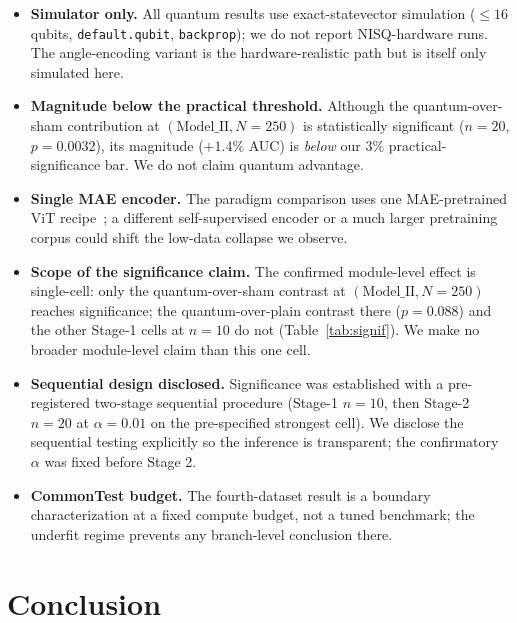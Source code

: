 \documentclass[10pt,letterpaper]{article}
\theoremstyle{plain}
\theoremstyle{definition}
\begin{document}
\begin{itemize}
  \item \textbf{Simulator only.} All quantum results use exact-statevector
        simulation ($\leq16$ qubits, \texttt{default.qubit}, \texttt{backprop});
        we do not report NISQ-hardware runs. The angle-encoding variant is the
        hardware-realistic path but is itself only simulated here.
  \item \textbf{Magnitude below the practical threshold.} Although the
        quantum-over-sham contribution at $(\text{Model\_II}, N{=}250)$ is
        statistically significant ($n{=}20$, $p{=}0.0032$), its magnitude
        ($+1.4\%$ AUC) is \emph{below} our $3\%$ practical-significance bar. We do
        not claim quantum advantage.
  \item \textbf{Single MAE encoder.} The paradigm comparison uses one
        MAE-pretrained ViT recipe~\cite{prasha2025masked}; a different
        self-supervised encoder or a much larger pretraining corpus could shift
        the low-data collapse we observe.
  \item \textbf{Scope of the significance claim.} The confirmed module-level
        effect is single-cell: only the quantum-over-sham contrast at
        $(\text{Model\_II}, N{=}250)$ reaches significance; the quantum-over-plain
        contrast there ($p{=}0.088$) and the other Stage-1 cells at $n{=}10$ do
        not (Table~\ref{tab:signif}). We make no broader module-level claim than
        this one cell.
  \item \textbf{Sequential design disclosed.} Significance was established with a
        pre-registered two-stage sequential procedure (Stage-1 $n{=}10$, then
        Stage-2 $n{=}20$ at $\alpha{=}0.01$ on the pre-specified strongest cell).
        We disclose the sequential testing explicitly so the inference is
        transparent; the confirmatory $\alpha$ was fixed before Stage 2.
  \item \textbf{CommonTest budget.} The fourth-dataset result is a
        boundary characterization at a fixed compute budget, not a tuned benchmark;
        the underfit regime prevents any branch-level conclusion there.
\end{itemize}

\section{Conclusion}
\label{sec:conclusion}
\end{document}
